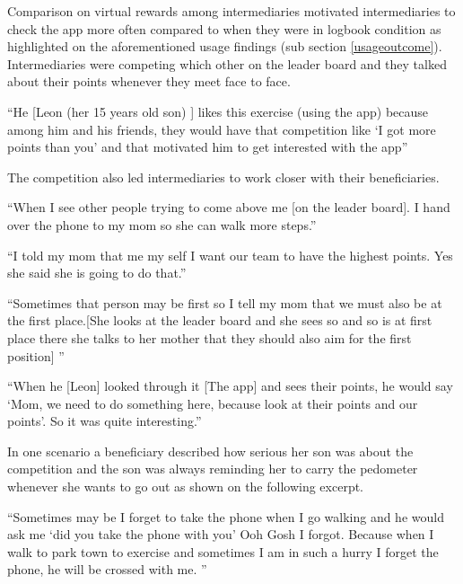 \begin{enumerate}
Comparison on virtual rewards among intermediaries motivated intermediaries to check the app more often compared to when they were in logbook condition as highlighted on the aforementioned usage findings (sub section \ref{usageoutcome}). Intermediaries were competing which other on the leader board and they talked about their points whenever they meet face to face.

 {``He [Leon (her 15 years old son) ] likes this exercise (using the app) because among him and his friends, they would have that competition like `I got more points than you' and that motivated him to get interested with the app''} 

The competition also led intermediaries to work closer with their beneficiaries.

 {``When I see other people trying to come above me [on the leader board]. I hand over the phone to my mom so she can walk more steps.''} 

 {``I told my mom that me my self I want our team to have the highest points. Yes she said she is going to do that.''} 

 {``Sometimes that person may be first so I tell my mom that we must also be at the first place.[She looks at the  leader board and she sees so and so is at first place there she talks to her mother that they should also aim for the first position] ''} 

 {``When he [Leon] looked through it [The app] and sees their points, he would say `Mom, we need to do something here, because look at their points and our points'. So it was quite interesting.''} 

In one scenario a beneficiary described how serious her son was about the competition and the son was always reminding her to carry the pedometer whenever she wants to go out as shown on the following excerpt.

 {``Sometimes may be I forget to take the phone when I go walking and he would ask me `did you take the phone with you' Ooh Gosh I forgot.  Because when I walk to park town to exercise and sometimes  I am in such a hurry I forget the phone, he will be crossed with me. ''} 


\end{enumerate}
